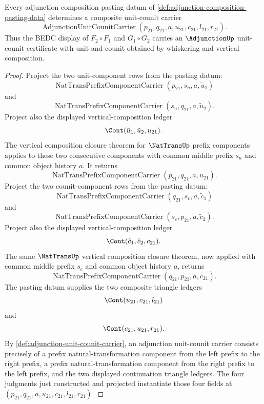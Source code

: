 \begin{theorem}
\label{thm:adjunction-composition-unit-counit-carrier}
Every adjunction composition pasting datum of \autoref{def:adjunction-composition-pasting-data} determines a composite unit-counit carrier
$$
\operatorname{AdjunctionUnitCounitCarrier}(p_{21},q_{21},a,u_{21},c_{21},l_{21},r_{21}).
$$
Thus the BEDC display of $F_2\circ F_1$ and $G_1\circ G_2$ carries an $\AdjunctionUp$ unit-counit certificate with unit and counit obtained by whiskering and vertical composition.
\end{theorem}
\begin{proof}
Project the two unit-component rows from the pasting datum:
$$
\operatorname{NatTransPrefixComponentCarrier}(p_{21},s_u,a,\tilde u_1)
$$
and
$$
\operatorname{NatTransPrefixComponentCarrier}(s_u,q_{21},a,\tilde u_2).
$$
Project also the displayed vertical-composition ledger
$$
\Cont(\tilde u_1,\tilde u_2,u_{21}).
$$
The vertical composition closure theorem for $\NatTransUp$ prefix components applies to these two consecutive components with common middle prefix $s_u$ and common object history $a$. It returns
$$
\operatorname{NatTransPrefixComponentCarrier}(p_{21},q_{21},a,u_{21}).
$$
Project the two counit-component rows from the pasting datum:
$$
\operatorname{NatTransPrefixComponentCarrier}(q_{21},s_c,a,\tilde c_1)
$$
and
$$
\operatorname{NatTransPrefixComponentCarrier}(s_c,p_{21},a,\tilde c_2).
$$
Project also the displayed vertical-composition ledger
$$
\Cont(\tilde c_1,\tilde c_2,c_{21}).
$$
The same $\NatTransUp$ vertical composition closure theorem, now applied with common middle prefix $s_c$ and common object history $a$, returns
$$
\operatorname{NatTransPrefixComponentCarrier}(q_{21},p_{21},a,c_{21}).
$$
The pasting datum supplies the two composite triangle ledgers
$$
\Cont(u_{21},c_{21},l_{21})
$$
and
$$
\Cont(c_{21},u_{21},r_{21}).
$$
By \autoref{def:adjunction-unit-counit-carrier}, an adjunction unit-counit carrier consists precisely of a prefix natural-transformation component from the left prefix to the right prefix, a prefix natural-transformation component from the right prefix to the left prefix, and the two displayed continuation triangle ledgers. The four judgments just constructed and projected instantiate those four fields at $(p_{21},q_{21},a,u_{21},c_{21},l_{21},r_{21})$.
\end{proof}

